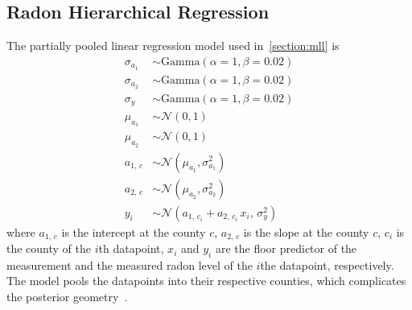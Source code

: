 \subsection{Radon Hierarchical Regression}
The partially pooled linear regression model used in~\cref{section:mll} is
\begin{align*}
  \sigma_{a_1} &\sim \mathrm{Gamma}\left( \alpha = 1, \beta = 0.02 \right) \\
  \sigma_{a_2} &\sim \mathrm{Gamma}\left( \alpha = 1, \beta = 0.02 \right) \\
  \sigma_{y}  &\sim \mathrm{Gamma}\left( \alpha = 1, \beta = 0.02 \right) \\
  \mu_{a_1}    &\sim \mathcal{N}\left( 0, 1 \right) \\
  \mu_{a_2}    &\sim \mathcal{N}\left( 0, 1 \right) \\
  a_{1,\, c}     &\sim \mathcal{N}\left( \mu_{a_1}, \sigma_{a_1}^2 \right) \\
  a_{2,\, c}     &\sim \mathcal{N}\left( \mu_{a_2}, \sigma_{a_2}^2 \right) \\
  y_i         &\sim \mathcal{N}\left( a_{1,\, c_i} + a_{2,\, c_i}\,x_i,\, \sigma_y^2 \right)
\end{align*}
where \(a_{1,\,c}\) is the intercept at the county \(c\), \(a_{2,\,c}\) is the slope at the county \(c\), \(c_i\) is the county of the \(i\)th datapoint, \(x_i\) and \(y_i\) are the floor predictor of the measurement and the measured radon level of the \(i\)the datapoint, respectively.
The model pools the datapoints into their respective counties, which complicates the posterior geometry~\citep{betancourt_hierarchical_2020}.

